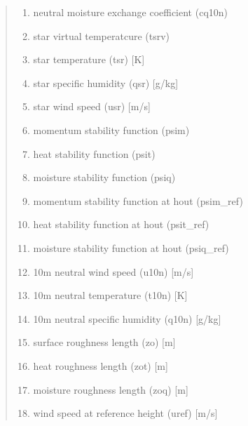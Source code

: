\documentclass[letterpaper,10pt,english]{sphinxmanual}
\begin{document}
\begin{fulllineitems}
\begin{quote}
\begin{description}
\begin{itemize}
\begin{description}
\begin{enumerate}
\item {} 
\sphinxAtStartPar
neutral moisture exchange coefficient (cq10n)

\item {} 
\sphinxAtStartPar
star virtual temperatcure (tsrv)

\item {} 
\sphinxAtStartPar
star temperature (tsr) {[}K{]}

\item {} 
\sphinxAtStartPar
star specific humidity (qsr) {[}g/kg{]}

\item {} 
\sphinxAtStartPar
star wind speed (usr) {[}m/s{]}

\item {} 
\sphinxAtStartPar
momentum stability function (psim)

\item {} 
\sphinxAtStartPar
heat stability function (psit)

\item {} 
\sphinxAtStartPar
moisture stability function (psiq)

\item {} 
\sphinxAtStartPar
momentum stability function at hout (psim\_ref)

\item {} 
\sphinxAtStartPar
heat stability function at hout (psit\_ref)

\item {} 
\sphinxAtStartPar
moisture stability function at hout (psiq\_ref)

\item {} 
\sphinxAtStartPar
10m neutral wind speed (u10n) {[}m/s{]}

\item {} 
\sphinxAtStartPar
10m neutral temperature (t10n) {[}K{]}

\item {} 
\sphinxAtStartPar
10m neutral specific humidity (q10n) {[}g/kg{]}

\item {} 
\sphinxAtStartPar
surface roughness length (zo) {[}m{]}

\item {} 
\sphinxAtStartPar
heat roughness length (zot) {[}m{]}

\item {} 
\sphinxAtStartPar
moisture roughness length (zoq) {[}m{]}

\item {} 
\sphinxAtStartPar
wind speed at reference height (uref) {[}m/s{]}


\end{enumerate}
\end{description}
\end{itemize}
\end{description}
\end{quote}
\end{fulllineitems}
\end{document}
